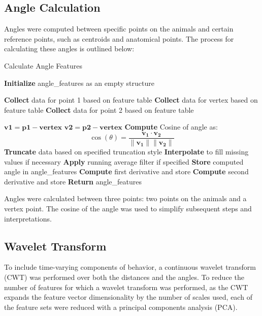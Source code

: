 \documentclass[12pt,english]{article}
\begin{document}
\newpage
\subsection
{Angle Calculation}
Angles were computed between specific points on the animals and certain reference points, such as centroids and anatomical points. The process for calculating these angles is outlined below:

\begin{algorithm}
\caption{Calculate Angle Features}
\begin{algorithmic}[1]
\State \textbf{Initialize} angle\_features as an empty structure

        \State \textbf{Collect} data for point 1 based on feature table
        \State \textbf{Collect} data for vertex based on feature table
        \State \textbf{Collect} data for point 2 based on feature table
        
        \State $ \mathbf{v1} = \mathbf{p1} - \mathbf{vertex} $
        \State $ \mathbf{v2} = \mathbf{p2} - \mathbf{vertex} $
        \State \textbf{Compute} Cosine of angle as:
        \[
        \cos(\theta) = \frac{\mathbf{v_1} \cdot \mathbf{v_2}}{\|\mathbf{v_1}\| \|\mathbf{v_2}\|}
        \]
        \State \textbf{Truncate} data based on specified truncation style
        \State \textbf{Interpolate} to fill missing values if necessary
        \State \textbf{Apply} running average filter if specified
        \State \textbf{Store} computed angle in angle\_features
            \State \textbf{Compute} first derivative and store
                \State \textbf{Compute} second derivative and store
            \EndIf
        \EndIf
    \EndIf
\EndFor
\State \textbf{Return} angle\_features
\end{algorithmic}
\end{algorithm}

Angles were calculated between three points: two points on the animals and a vertex point. The cosine of the angle was used to simplify subsequent steps and interpretations.


\subsection{Wavelet Transform}
To include time-varying components of behavior, a continuous wavelet transform (CWT) was performed over both the distances and the angles. To reduce the number of features for which a wavelet transform was performed, as the CWT expands the feature vector dimensionality by the number of scales used, each of the feature sets were reduced with a principal components analysis (PCA).
\end{document}
